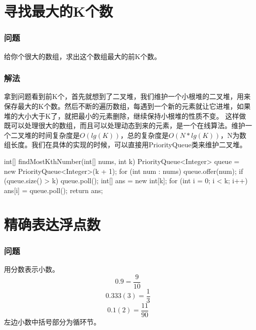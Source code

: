 \section{寻找最大的K个数} %
\label{sec:find-k-great-number}

\subsubsection{问题}
给你个很大的数组，求出这个数组最大的前K个数。

\subsubsection{解法}
拿到问题看到前K个，首先就想到了二叉堆，我们维护一个小根堆的二叉堆，用来保存最大的K个数。然后不断的遍历数组，每遇到一个新的元素就让它进堆，如果堆的大小大于K了，就把最小的元素删除，继续保持小根堆的性质不变。
这样做既可以处理很大的数组，而且可以处理动态到来的元素，是一个在线算法。维护一个二叉堆的时间复杂度是$O(lg(K))$，总的复杂度是$O(N*lg(K))$，N为数组长度。我们在具体的实现的时候，可以直接用PriorityQueue类来维护二叉堆。
\begin{Codex}[label={[$O(N*lg(K))+O(K)$]Chap02_05_FindKthNumber.java}]
int[] findMostKthNumber(int[] nums, int k) {
    PriorityQueue<Integer> queue = new PriorityQueue<Integer>(k + 1);
    for (int num : nums) {
        queue.offer(num);
        if (queue.size() > k) {
            queue.poll();
        }
    }
    int[] ans = new int[k];
    for (int i = 0; i < k; i++) {
        ans[i] = queue.poll();
    }
    return ans;
}
\end{Codex}


\section{精确表达浮点数} %
\label{sec:float-number}

\subsubsection{问题}
用分数表示小数。
\[ 0.9 = \frac{9}{10} \]
\[ 0.333(3) = \frac{1}{3} \]
\[ 0.1(2) = \frac{11}{90} \]
左边小数中括号部分为循环节。

